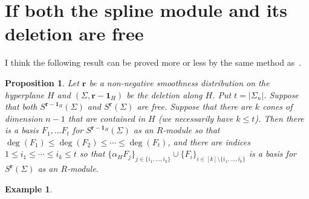 \documentclass[11pt, reqno]{amsart}
\newcommand{\ZZ}{\mathbb{Z}}
\newcommand{\br}{\mathbf{r}}
\newtheorem{lemma}[theorem]{Lemma}
\newtheorem{proposition}[theorem]{Proposition}
\theoremstyle{definition}
\newtheorem{example}[theorem]{Example}
\theoremstyle{remark}
\numberwithin{equation}{section}
\begin{document}
\section{If both the spline module and its deletion are free}

I think the following result can be proved more or less by the same method as~\cite[Theorem~0.4]{ATW08}.

\begin{proposition}
Let $\br$ be a non-negative smoothness distribution on the hyperplane $H$ and $(\Sigma,\br-\mathbf{1}_H)$ be the deletion along $H$.	 Put $t=|\Sigma_n|$.  Suppose that both $S^{\br-\mathbf{1}_H}(\Sigma)$ and $S^{\br}(\Sigma)$ are free.  Suppose that there are $k$ cones of dimension $n-1$ that are contained in $H$ (we necessarily have $k\le t$).  Then there is a basis $F_1,\ldots F_t$ for $S^{\br-\mathbf{1}_H}(\Sigma)$ as an $R$-module so that $\deg(F_1)\le \deg(F_2)\le \cdots\le \deg(F_t)$, and there are indices $1\le i_1\le \cdots \le i_k\le t$ so that $\{\alpha_HF_j\}_{j\in\{i_1,\ldots,i_k\}}\cup \{F_i\}_{i\in [k]\setminus \{i_1,\ldots,i_k\}}$ is a basis for $S^{\br}(\Sigma)$ as an $R$-module.
\end{proposition}

\begin{example}

\end{example}

%
%
%
%
\end{document}
